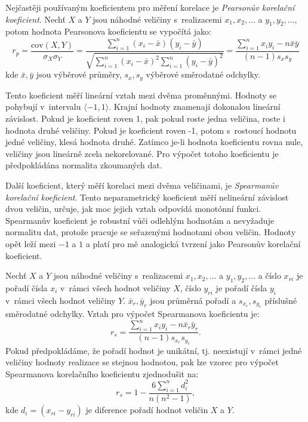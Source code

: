 Nejčastěji používaným koeficientem pro měření korelace je \emph{Pearsonův korelační koeficient}. Nechť $X$ a $Y$ jsou náhodné veličiny s~realizacemi $x_1, x_2, \ldots$ a $y_1, y_2, \ldots$, potom hodnota Pearsonova koeficientu se vypočítá jako:
\begin{equation}
    r_p = \frac{\mathrm{cov}(X,Y)}{\sigma_X\sigma_Y} = 
    \frac{ \sum_{i=1}^{n}(x_i-\bar{x})(y_i-\bar{y}) }
    {
        \sqrt{
            \sum_{i=1}^{n}(x_i-\bar{x})^2
            \sum_{i=1}^{n}(y_i-\bar{y})^2
            }
    } 
    = \frac{ \sum_{i=1}^{n}x_i y_i - n\bar{x}\bar{y} }
    {
          (n-1) s_{x} s_{y}
    }
\end{equation}
kde $\bar{x}, \bar{y}$ jsou výběrové průměry, $s_x, s_y$ výběrové směrodatné odchylky.\cite{bib:MB}

Tento koeficient měří lineární vztah mezi dvěma proměnnými. Hodnoty se pohybují v~intervalu $\langle -1, 1 \rangle$. Krajní hodnoty znamenají dokonalou lineární závislost. Pokud je koeficient roven 1, pak pokud roste jedna veličina, roste i hodnota druhé veličiny. Pokud je koeficient roven -1, potom s~rostoucí hodnotu jedné veličiny, klesá hodnota druhé. Zatímco je-li hodnota koeficientu rovna nule, veličiny jsou lineárně zcela nekorelované. Pro výpočet totoho koeficientu je předpokládána normalita zkoumaných dat.\cite{bib:MB}

Další koeficient, který měří korelaci mezi dvěma veličinami, je \emph{Spearmanův korelační koeficient}. Tento neparametrický koeficient měří nelineární závislost dvou veličin, určuje, jak moc jejich vztah odpovídá monotónní funkci. Spearmanův koeficient je robustní vůči odlehlým hodnotám a nevyžaduje normalitu dat, protože pracuje se seřazenými hodnotami obou veličin. Hodnoty opět leží mezi $-1$ a $1$ a platí pro mě analogická tvrzení jako Pearsonův korelační koeficient.\cite{bib:MB,bib:correlation}

Nechť $X$ a $Y$ jsou náhodné veličiny s~realizacemi $x_1, x_2, \ldots$ a $y_1, y_2, \ldots$ a číslo $x_{ri}$ je pořadí čísla $x_i$ v~rámci všech hodnot veličiny $X$, číslo $y_{ri}$ je pořadí čísla $y_i$ v~rámci všech hodnot veličiny $Y$. $\bar{x}_r, \bar{y}_r$ jsou průměrná pořadí a $s_{x_r}, s_{y_r}$ příslušné směrodatné odchylky. Vztah pro výpočet Spearmanova koeficientu je:
\begin{equation}
    r_s =
    \frac{ \sum_{i=1}^{n}x_iy_i - n\bar{x}_r\bar{y}_r }
    {
          (n-1) s_{x_r} s_{y_r}
    }.
\end{equation}
Pokud předpokládáme, že pořadí hodnot je unikátní, tj. neexistují v~rámci jedné veličiny hodnoty realizace se stejnou hodnotou, pak lze vzorec pro výpočet Spearmanova korelačního koeficientu zjednodušit na:
\begin{equation}
    r_s = 1-
    \frac{ 6 \sum_{i=1}^{n}d_i^2 }{n(n^2-1)},
\end{equation}
kde $d_i = (x_{ri} - y_{ri})$ je diference pořadí hodnot veličin $X$ a $Y$.\cite{bib:MB,bib:correlation}


